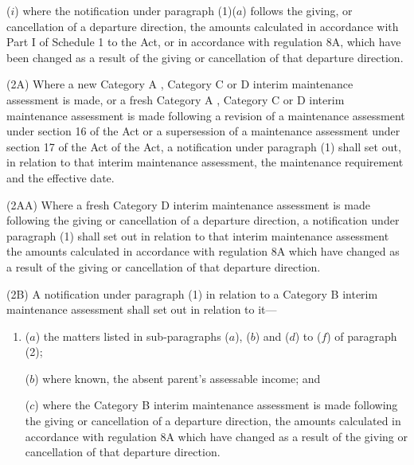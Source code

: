 \documentclass[a4paper,12pt]{article}
\begin{document}
\begin{enumerate}
($i$) where the notification under paragraph (1)($a$) 
follows the giving, or cancellation of a departure direction, the amounts calculated in accordance with Part I of Schedule 1 to the Act, or in accordance with regulation 8A, which have been changed as a result of the giving or cancellation of that departure direction.
\end{enumerate}

(2A) Where a new Category A%
, Category C or D  %
interim maintenance assessment is made, or a fresh Category A%
, Category C or D  %
interim maintenance assessment is made following 
a revision of a maintenance assessment under section 16 of the Act or a supersession of a maintenance assessment under section 17 of the Act  %
of the Act, a notification under paragraph (1) shall set out, in relation to that interim maintenance assessment, the maintenance requirement and the effective date.

(2AA) Where a fresh Category D interim maintenance assessment is made following the giving or cancellation of a departure direction, a notification under paragraph (1) shall set out in relation to that interim maintenance assessment the amounts calculated in accordance with regulation 8A which have changed as a result of the giving or cancellation of that departure direction.

(2B) A notification under paragraph (1) in relation to a Category B interim maintenance assessment shall set out in relation to it—
\begin{enumerate}\item[]
%

($a$) the matters listed in sub-paragraphs ($a$), ($b$) and ($d$) to ($f$) of paragraph (2);

($b$) where known, the absent parent’s assessable income; and

($c$) where the Category B interim maintenance assessment is made following the giving or cancellation of a departure direction, the amounts calculated in accordance with regulation 8A which have changed as a result of the giving or cancellation of that departure direction.
\end{enumerate}
\end{document}
